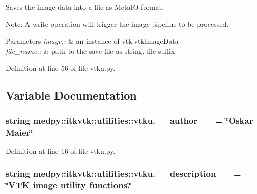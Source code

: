 Saves the image data into a file as MetaIO format. 

Note: A write operation will trigger the image pipeline to be processed. 
\begin{DoxyParams}{Parameters}
{\em image,:} & an instance of vtk.vtkImageData \\
\hline
{\em file\_\-name,:} & path to the save file as string,  file-\/suffix \\
\hline
\end{DoxyParams}


Definition at line 56 of file vtku.py.



\subsection{Variable Documentation}
\hypertarget{namespacemedpy_1_1itkvtk_1_1utilities_1_1vtku_af43a92420c5560bc5b4924efc2d4e904}{
\subsubsection[{\_\-\_\-author\_\-\_\-}]{\setlength{\rightskip}{0pt plus 5cm}string {\bf medpy::itkvtk::utilities::vtku.\_\-\_\-author\_\-\_\-} = \char`\"{}Oskar Maier\char`\"{}}}
\label{namespacemedpy_1_1itkvtk_1_1utilities_1_1vtku_af43a92420c5560bc5b4924efc2d4e904}


Definition at line 16 of file vtku.py.

\hypertarget{namespacemedpy_1_1itkvtk_1_1utilities_1_1vtku_a0bd69d35b952bfa07aefe2e221bd887f}{
\subsubsection[{\_\-\_\-description\_\-\_\-}]{\setlength{\rightskip}{0pt plus 5cm}string {\bf medpy::itkvtk::utilities::vtku.\_\-\_\-description\_\-\_\-} = \char`\"{}VTK image utility functions.\char`\"{}}}
\label{namespacemedpy_1_1itkvtk_1_1utilities_1_1vtku_a0bd69d35b952bfa07aefe2e221bd887f}


